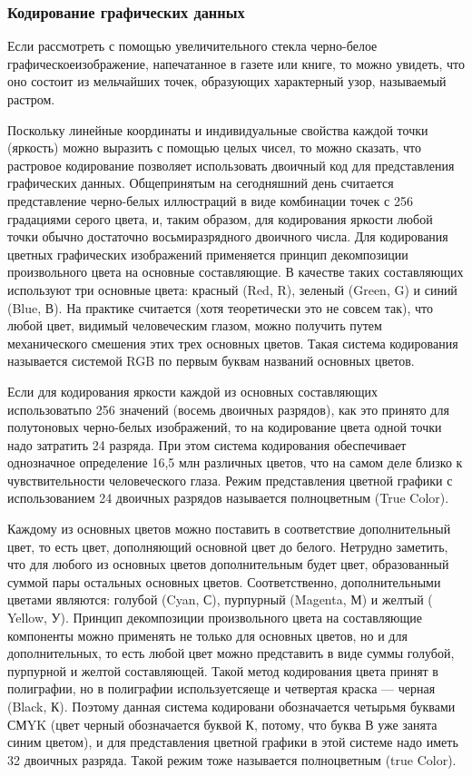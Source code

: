 \documentclass[a4paper]{article}
\begin{document}
\subsubsection{Кодирование графических данных}

Если рассмотреть с помощью увеличительного стекла черно-белое графическоеизображение, напечатанное в газете или книге, то можно увидеть, что оно состоит из мельчайших точек, образующих характерный узор, называемый растром.

Поскольку линейные координаты и индивидуальные свойства каждой точки (яркость) можно выразить с помощью целых чисел, то можно сказать, что растровое кодирование позволяет использовать двоичный код для представления графических данных. Общепринятым на сегодняшний день считается представление черно-белых иллюстраций в виде комбинации точек с 256 градациями серого цвета, и, таким образом, для кодирования яркости любой точки обычно достаточно восьмиразрядного двоичного числа. Для кодирования цветных графических изображений применяется принцип декомпозиции произвольного цвета на основные составляющие. В качестве таких составляющих используют три основные цвета: красный (Red, R), зеленый (Green, G) и синий (Blue, В). На практике считается (хотя теоретически это не совсем так), что любой цвет, видимый человеческим глазом, можно получить путем механического смешения этих трех основных цветов. Такая система кодирования называется системой RGB по первым буквам названий основных цветов.

Если для кодирования яркости каждой из основных составляющих использоватьпо 256 значений (восемь двоичных разрядов), как это принято для полутоновых черно-белых изображений, то на кодирование цвета одной точки надо затратить 24 разряда. При этом система кодирования обеспечивает однозначное определение 16,5 млн различных цветов, что на самом деле близко к чувствительности человеческого глаза. Режим представления цветной графики с использованием 24 двоичных разрядов называется полноцветным (True Color).

Каждому из основных цветов можно поставить в соответствие дополнительный цвет, то есть цвет, дополняющий основной цвет до белого. Нетрудно заметить, что для любого из основных цветов дополнительным будет цвет, образованный суммой пары остальных основных цветов. Соответственно, дополнительными цветами являются: голубой (Cyan, С), пурпурный (Magenta, М) и желтый ( Yellow, У). Принцип декомпозиции произвольного цвета на составляющие компоненты можно применять не только для основных цветов, но и для дополнительных, то есть любой цвет можно представить в виде суммы голубой, пурпурной и желтой составляющей. Такой метод кодирования цвета принят в полиграфии, но в полиграфии используетсяеще и четвертая краска — черная (Black, К). Поэтому данная система кодировани обозначается четырьмя буквами СМYK (цвет черный обозначается буквой К, потому,
что буква В уже занята синим цветом), и для представления цветной графики в этой системе надо иметь 32 двоичных разряда. Такой режим тоже называется полноцветным (true Color).
\end{document}
